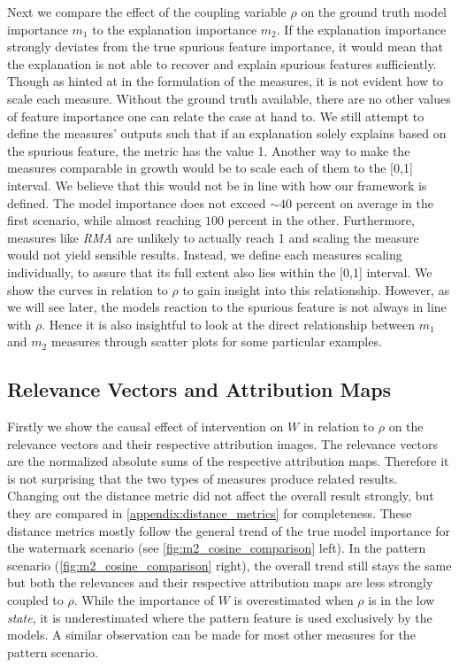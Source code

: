 Next we compare the effect of the coupling variable $\rho$ on the ground truth model importance $m_1$ to the explanation importance $m_2$. 
If the explanation importance strongly deviates from the true spurious feature importance, it would mean that the explanation is not able to recover and explain spurious features sufficiently. Though as hinted at in the formulation of the measures, it is not evident how to scale each measure. Without the ground truth available, there are no other values of feature importance one can relate the case at hand to. We still attempt to define the measures' outputs such that if an explanation solely explains based on the spurious feature, the metric has the value 1. 
Another way to make the measures comparable in growth would be to scale each of them to the [0,1] interval. We believe that this would not be in line with how our framework is defined. The model importance does not exceed $\sim 40$ percent on average in the first scenario, while almost reaching $100$ percent in the other. Furthermore, measures like \textit{RMA} are unlikely to actually reach 1 and scaling the measure would not yield sensible results. Instead, we define each measures scaling individually, to assure that its full extent also lies within the [0,1] interval.
We show the curves in relation to $\rho$ to gain insight into this relationship. However, as we will see later, the models reaction to the spurious feature is not always in line with $\rho$. Hence it is also insightful to look at the direct relationship between $m_1$ and $m_2$ measures through scatter plots for some particular examples.

\subsection{Relevance Vectors and Attribution Maps}
Firstly we show the causal effect of intervention on $W$ in relation to $\rho$ on the relevance vectors and their respective attribution images. 
The relevance vectors are the normalized absolute sums of the respective attribution maps. Therefore it is not surprising that the two types of measures produce related results. Changing out the distance metric did not affect the overall result strongly, but they are compared in \cref{appendix:distance_metrics} for completeness.
These distance metrics mostly follow the general trend of the true model importance for the watermark scenario (see \cref{fig:m2_cosine_comparison} left). In the pattern scenario (\cref{fig:m2_cosine_comparison} right), the overall trend still stays the same but both the relevances and their respective attribution maps are less strongly coupled to $\rho$. While the importance of $W$ is overestimated when $\rho$ is in the low \textit{state}, it is underestimated where the pattern feature is used exclusively by the models. A similar observation can be made for most other measures for the pattern scenario. 


